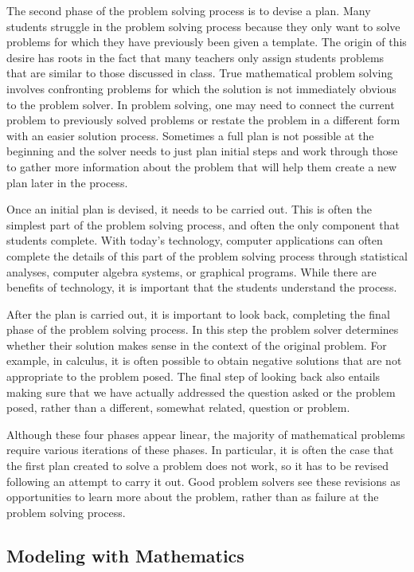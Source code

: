 \documentclass[
]{book}
\theoremstyle{definition}
\theoremstyle{definition}
\theoremstyle{definition}
\theoremstyle{definition}
\theoremstyle{remark}
\begin{document}
The second phase of the problem solving process is to devise a plan. Many students struggle in the problem solving process because they only want to solve problems for which they have previously been given a template. The origin of this desire has roots in the fact that many teachers only assign students problems that are similar to those discussed in class. True mathematical problem solving involves confronting problems for which the solution is not immediately obvious to the problem solver. In problem solving, one may need to connect the current problem to previously solved problems or restate the problem in a different form with an easier solution process. Sometimes a full plan is not possible at the beginning and the solver needs to just plan initial steps and work through those to gather more information about the problem that will help them create a new plan later in the process.

Once an initial plan is devised, it needs to be carried out. This is often the simplest part of the problem solving process, and often the only component that students complete. With today's technology, computer applications can often complete the details of this part of the problem solving process through statistical analyses, computer algebra systems, or graphical programs. While there are benefits of technology, it is important that the students understand the process.

After the plan is carried out, it is important to look back, completing the final phase of the problem solving process. In this step the problem solver determines whether their solution makes sense in the context of the original problem. For example, in calculus, it is often possible to obtain negative solutions that are not appropriate to the problem posed. The final step of looking back also entails making sure that we have actually addressed the question asked or the problem posed, rather than a different, somewhat related, question or problem.

Although these four phases appear linear, the majority of mathematical problems require various iterations of these phases. In particular, it is often the case that the first plan created to solve a problem does not work, so it has to be revised following an attempt to carry it out. Good problem solvers see these revisions as opportunities to learn more about the problem, rather than as failure at the problem solving process.

\hypertarget{modeling-with-mathematics}{%
\subsection{Modeling with Mathematics}\label{modeling-with-mathematics}}
\end{document}
